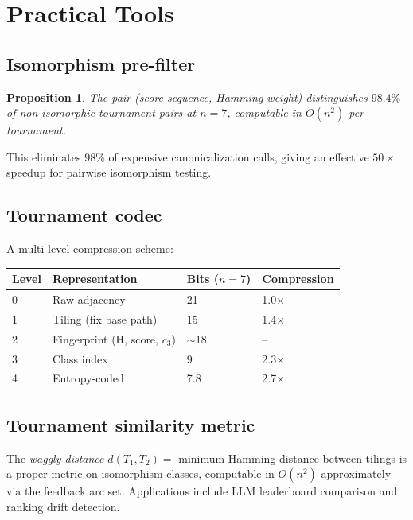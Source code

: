 \documentclass[11pt,a4paper]{article}
\newtheorem{proposition}[theorem]{Proposition}
\theoremstyle{definition}
\theoremstyle{remark}
\begin{document}
\section{Practical Tools}
\label{sec:tools}

\subsection{Isomorphism pre-filter}

\begin{proposition}
The pair (score sequence, Hamming weight) distinguishes $98.4\%$ of non-isomorphic tournament pairs at $n = 7$, computable in $O(n^2)$ per tournament.
\end{proposition}

This eliminates $98\%$ of expensive canonicalization calls, giving an effective $50\times$ speedup for pairwise isomorphism testing.

\subsection{Tournament codec}

A multi-level compression scheme:
\begin{center}
\begin{tabular}{llll}
\toprule
Level & Representation & Bits ($n=7$) & Compression \\
\midrule
0 & Raw adjacency & 21 & 1.0$\times$ \\
1 & Tiling (fix base path) & 15 & 1.4$\times$ \\
2 & Fingerprint (H, score, $c_3$) & $\sim$18 & -- \\
3 & Class index & 9 & 2.3$\times$ \\
4 & Entropy-coded & 7.8 & 2.7$\times$ \\
\bottomrule
\end{tabular}
\end{center}

\subsection{Tournament similarity metric}

The \emph{waggly distance} $d(T_1, T_2) = $ minimum Hamming distance between tilings is a proper metric on isomorphism classes, computable in $O(n^2)$ approximately via the feedback arc set. Applications include LLM leaderboard comparison and ranking drift detection.
\end{document}

